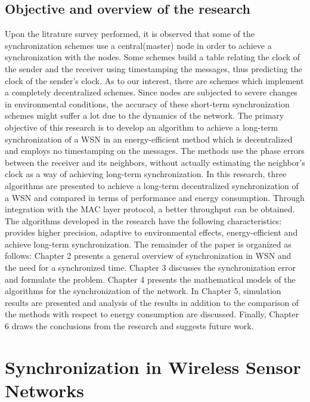 \documentclass[a4paper,10pt]{report}
\begin{document}
\section{\textbf{Objective and overview of the research}}
Upon the litrature survey performed, it is observed that some of the synchronization schemes use a central(master) node in order to achieve a synchronization with the nodes. Some schemes build a table relating the clock of the sender and the receiver using timestamping the messages, thus predicting the clock of the sender's clock. As to our interest, there are schemes which implement a completely decentralized schemes. Since nodes are subjected to severe changes in environmental conditions, the accuracy of these short-term synchronization schemes might suffer a lot due to the dynamics of the network.
\newline
The primary objective of this research is to develop an algorithm to achieve a long-term synchronization of a WSN in an energy-efficient method which is decentralized and employs no timestamping on the messages. The methods use the phase errors
between the receiver and its neighbors, without actually estimating the neighbor's clock as a way of achieving long-term synchronization. In this research, three algorithms are presented to achieve a long-term decentralized synchronization of a WSN and compared in terms of performance and energy consumption. Through integration with the MAC layer protocol, a better throughput can be obtained. The algorithms developed in the research have the following characteristics: provides higher precision, adaptive to environmental effects, energy-efficient and achieve long-term synchronization. 
\newline The remainder of the paper is organized as follows:  Chapter 2 presents a general overview of synchronization in WSN and the need
for a synchronized time. Chapter 3 discusses the synchronization error and formulate the problem. Chapter 4 presents the
mathematical models of the algorithms for the synchronization of the network. In Chapter 5, simulation results are presented and analysis of the results in addition to the comparison of the methods with respect to energy consumption are discussed. Finally, Chapter 6
draws the conclusions from the research and suggests future work. 
\chapter{\textbf{Synchronization in Wireless Sensor Networks}}
\end{document}
